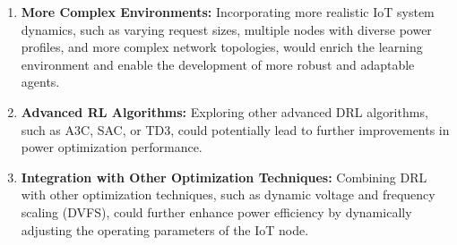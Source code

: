 \documentclass[11pt,a4paper]{article}
\begin{document}
\begin{enumerate}
\item \textbf{More Complex Environments:} Incorporating more realistic IoT system dynamics, such as varying request sizes, multiple nodes with diverse power profiles, and more complex network topologies, would enrich the learning environment and enable the development of more robust and adaptable agents.

\item \textbf{Advanced RL Algorithms:} Exploring other advanced DRL algorithms, such as A3C, SAC, or TD3, could potentially lead to further improvements in power optimization performance.

\item \textbf{Integration with Other Optimization Techniques:} Combining DRL with other optimization techniques, such as dynamic voltage and frequency scaling (DVFS), could further enhance power efficiency by dynamically adjusting the operating parameters of the IoT node.
\end{enumerate}
\end{document}
